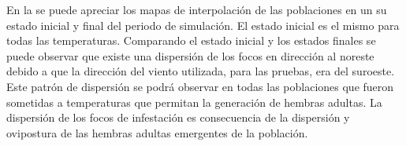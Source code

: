 En la  se puede apreciar los mapas de interpolación de las
poblaciones en un su estado inicial y final del periodo de simulación. El estado inicial es el
mismo para todas las temperaturas. Comparando el estado inicial y los estados finales se puede
observar que existe una dispersión de los focos en dirección al noreste debido a que la dirección
del viento utilizada, para las pruebas, era del suroeste. Este patrón de dispersión se podrá
observar en todas las poblaciones que fueron sometidas a temperaturas que permitan la generación
de hembras adultas. La dispersión de los focos de infestación es consecuencia de la dispersión y
ovipostura de las hembras adultas emergentes de la población.
